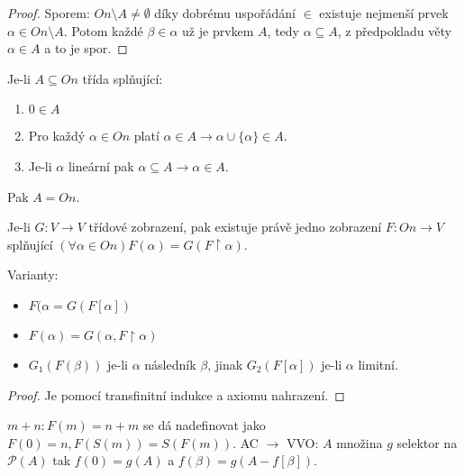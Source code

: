 \begin{proof}
	Sporem: $On \setminus A \neq \emptyset$ díky dobrému uspořádání $\in$ existuje nejmenší prvek $\alpha \in On \setminus A$. Potom každé $\beta \in \alpha$ už je prvkem $A$, tedy $\alpha \subseteq A$, z předpokladu věty $\alpha \in A$ a to je spor.
\end{proof}

\begin{thm}
	Je-li $A \subseteq On$ třída splňující:
	
	\begin{enumerate}
		\item $0 \in A$
		\item Pro každý $\alpha \in On$ platí $\alpha \in A \rightarrow \alpha \cup \{\alpha\} \in A$.
		\item Je-li $\alpha$ lineární pak $\alpha \subseteq A \rightarrow \alpha \in A$.
	\end{enumerate}
	
	Pak $A = On$.
\end{thm}

\begin{thm}
	Je-li $G: V \to V$ třídové zobrazení, pak existuje právě jedno zobrazení $F: On \to V$ splňující $(\forall \alpha \in On) F(\alpha) = G(F \upharpoonright \alpha)$.
	
	Varianty:
	
	\begin{itemize}
		\item $F(\alpha = G(F[\alpha])$
		\item $F(\alpha) = G(\alpha , F \upharpoonright \alpha)$
		\item $G_{1}(F(\beta))$ je-li $\alpha$ následník $\beta$, jinak $G_{2}(F[\alpha])$ je-li $\alpha$ limitní.
	\end{itemize}
\end{thm}

\begin{proof}
	Je pomocí transfinitní indukce a axiomu nahrazení.
\end{proof}

\begin{prikl}
	$m + n: F(m) = n+m$ se dá nadefinovat jako $F(0) = n, F(S(m)) = S(F(m))$. AC $\to$ VVO: $A$ množina $g$ selektor na $\mathcal{P}(A)$ tak $f(0) = g(A)$ a $f(\beta) = g(A - f[\beta])$.
\end{prikl}